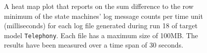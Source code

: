 \begin{figure}[htbp]
\centering
\begin{minipage}{1\textwidth}
  \centering
\end{minipage}
\caption{A heat map plot that reports on the sum difference to the row minimum of the state machines' log message counts per time unit (milliseconds) for each log file generated during run 18 of target model \texttt{Telephony}. Each file has a maximum size of 100MB. The results have been measured over a time span of 30 seconds.}
\label{figure:throughput_difference_random_det_telephony_18}
\end{figure}